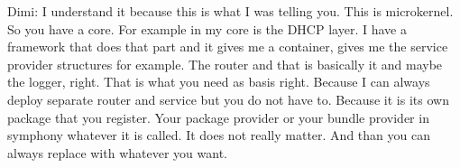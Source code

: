 Dimi: I understand it because this is what I was telling you. This is microkernel. So you have a core. For example in my core is the DHCP layer. I have a framework that does that part and it gives me a container, gives me the service provider structures for example. The router and that is basically it and maybe the logger, right. That is what you need as basis right. Because I can always deploy separate router and service but you do not have to. Because it is its own package that you register. Your package provider or your bundle provider in symphony whatever it is called. It does not really matter. And than you can always replace with whatever you want.
